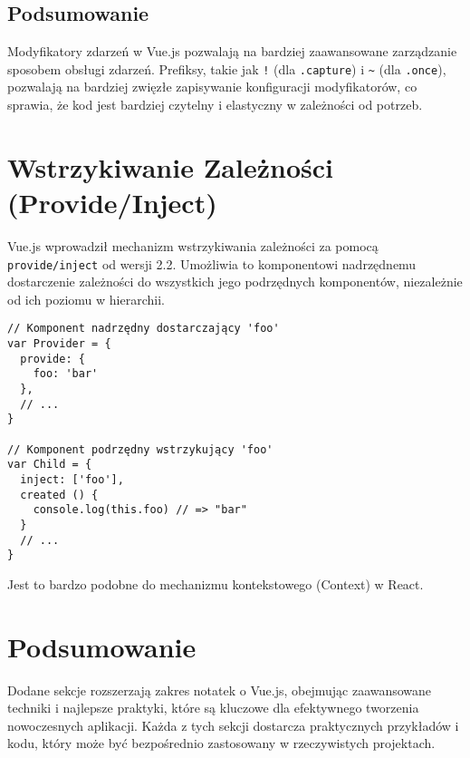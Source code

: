 \documentclass[a4paper,12pt]{article}
\begin{document}
\subsection{Podsumowanie}

Modyfikatory zdarzeń w Vue.js pozwalają na bardziej zaawansowane zarządzanie sposobem obsługi zdarzeń. Prefiksy, takie jak \texttt{!} (dla \texttt{.capture}) i \texttt{\textasciitilde} (dla \texttt{.once}), pozwalają na bardziej zwięzłe zapisywanie konfiguracji modyfikatorów, co sprawia, że kod jest bardziej czytelny i elastyczny w zależności od potrzeb.

\section{Wstrzykiwanie Zależności (Provide/Inject)}

Vue.js wprowadził mechanizm wstrzykiwania zależności za pomocą \texttt{provide/inject} od wersji 2.2. Umożliwia to komponentowi nadrzędnemu dostarczenie zależności do wszystkich jego podrzędnych komponentów, niezależnie od ich poziomu w hierarchii.

\begin{lstlisting}
// Komponent nadrzędny dostarczający 'foo'
var Provider = {
  provide: {
    foo: 'bar'
  },
  // ...
}

// Komponent podrzędny wstrzykujący 'foo'
var Child = {
  inject: ['foo'],
  created () {
    console.log(this.foo) // => "bar"
  }
  // ...
}
\end{lstlisting}

Jest to bardzo podobne do mechanizmu kontekstowego (Context) w React.

\section{Podsumowanie}
Dodane sekcje rozszerzają zakres notatek o Vue.js, obejmując zaawansowane techniki i najlepsze praktyki, które są kluczowe dla efektywnego tworzenia nowoczesnych aplikacji. Każda z tych sekcji dostarcza praktycznych przykładów i kodu, który może być bezpośrednio zastosowany w rzeczywistych projektach.
\end{document}
